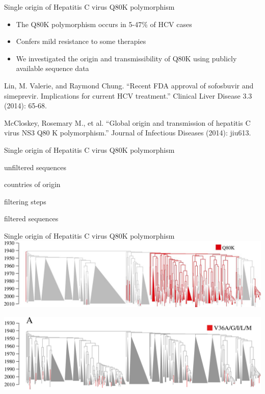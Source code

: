 \documentclass{beamer}
\begin{document}
\begin{frame}{Single origin of Hepatitis C virus Q80K polymorphism}
    \begin{itemize}
        \setlength{\itemsep}{12pt}
        \item The Q80K polymorphism occurs in 5-47\% of HCV cases
        \item Confers mild resistance to some therapies 
        \item We investigated the origin and transmissibility of Q80K using
            publicly available sequence data
    \end{itemize}

    \vspace{1cm}
    \tiny Lin, M. Valerie, and Raymond Chung. ``Recent FDA approval of sofosbuvir and simeprevir. Implications for current HCV treatment.'' Clinical Liver Disease 3.3 (2014): 65-68. \par
    \tiny McCloskey, Rosemary M., et al. ``Global origin and transmission of hepatitis C virus NS3 Q80 K polymorphism.'' Journal of Infectious Diseases (2014): jiu613. \par
\end{frame}

\begin{frame}{Single origin of Hepatitis C virus Q80K polymorphism}
    \begin{description}
        \setlength{\itemsep}{16pt}
        \item [{\Huge160 071}] unfiltered sequences
        \item [{\Huge13}] countries of origin
        \item [{\Huge4}] filtering steps
        \item [{\Huge724}] filtered sequences
    \end{description}
\end{frame}

\begin{frame}{Single origin of Hepatitis C virus Q80K polymorphism}
    \includegraphics[width=\textwidth]{mccloskey2015global_f1}

    \includegraphics[width=\textwidth]{mccloskey2015global_supp}
\end{frame}
\end{document}
